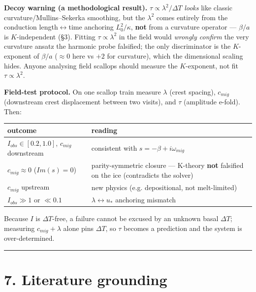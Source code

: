 \documentclass{jfm}
\begin{document}
\textbf{Decoy warning (a methodological result).} $\tau  \propto  \lambda ^{2}/\Delta T$ \emph{looks} like classic curvature/Mullins–Sekerka smoothing, but the $\lambda ^{2}$ comes entirely from the conduction length\ensuremath{\leftrightarrow}time anchoring $L_{0}^{2}/\kappa $, \textbf{not} from a curvature operator — $\beta /a$ is $K$-independent (§3). Fitting $\tau \propto \lambda ^{2}$ in the field would \emph{wrongly confirm} the very curvature ansatz the harmonic probe falsified; the only discriminator is the $K$-exponent of $\beta /a$ ($\approx 0$ here vs $+2$ for curvature), which the dimensional scaling hides. Anyone analysing field scallops should measure the $K$-exponent, not fit $\tau \propto \lambda ^{2}$.


\textbf{Field-test protocol.} On one scallop train measure $\lambda $ (crest spacing), $c_{mig}$ (downstream crest displacement between two visits), and $\tau $ (amplitude e-fold). Then:


\begin{center}\small
\begin{tabularx}{\linewidth}{>{\raggedright\arraybackslash}X>{\raggedright\arraybackslash}X}
\toprule
outcome & reading \\
\midrule
$I_{obs} \in  [0.2,1.0]$, $c_{mig}$ downstream & consistent with $s=-\beta +i\omega _{mig}$ \\
$c_{mig} \approx  0$ ($Im(s)=0$) & parity-symmetric closure — K-theory \textbf{not} falsified on the ice (contradicts the solver) \\
$c_{mig}$ upstream & new physics (e.g. depositional, not melt-limited) \\
$I_{obs} \gg  1$ or $\ll  0.1$ & $\lambda  \leftrightarrow  u_*$ anchoring mismatch \\
\bottomrule
\end{tabularx}
\end{center}


Because $I$ is $\Delta T$-free, a failure cannot be excused by an unknown basal $\Delta T$; measuring $c_{mig} + \lambda $ alone pins $\Delta T$, so $\tau $ becomes a prediction and the system is over-determined.


\medskip\hrule\medskip


\section*{7. Literature grounding}
\end{document}
